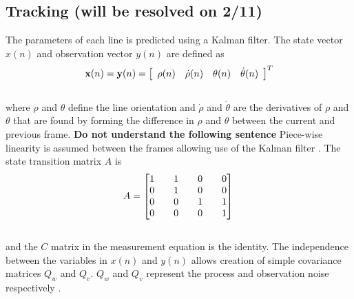 \documentclass{article}
\begin{document}
\subsection{Tracking (will be resolved on 2/11)}
The parameters of each line is predicted using a Kalman filter.
The state vector $x(n)$ and observation vector $y(n)$ are defined as
\begin{equation}
    {\bf x}(n)= {\bf y}(n)
     = \left[ \begin{array}{cccc}
        \rho (n) & \dot{\rho}(n) & \theta (n) & \dot{\theta}(n)
        \end{array} \right]^T
\label{eq:state_measure_vectors}
\end{equation}\\
where $\rho$ and $\theta$ define the line orientation and $\dot{\rho}$ and $\dot{\theta}$ are the derivatives of $\rho$ and $\theta$ that are found by forming the difference in $\rho $ and $\theta $ between the current and previous frame.
{\bf Do not understand the following sentence} Piece-wise linearity is assumed between the frames allowing use of the Kalman filter \cite{hayes_statistical_1996,brookner_tracking_1998}.
The state transition matrix $A$ is
\begin{equation}
A = \begin{bmatrix} 1 && 1 && 0 && 0 \\ 0 && 1 && 0 && 0 \\ 0 && 0 && 1 && 1 \\ 0 && 0 && 0 && 1 \\\end{bmatrix}\\
\label{eq:state_trans}
\end{equation}\\
and the $C$ matrix in the measurement equation is the identity.
The independence between the variables in $x(n)$ and $y(n)$ allows creation of simple covariance matrices $Q_w$ and $Q_v$. $Q_w$ and $Q_v$ represent the process and observation noise respectively \cite{hayes_statistical_1996}.
\end{document}
